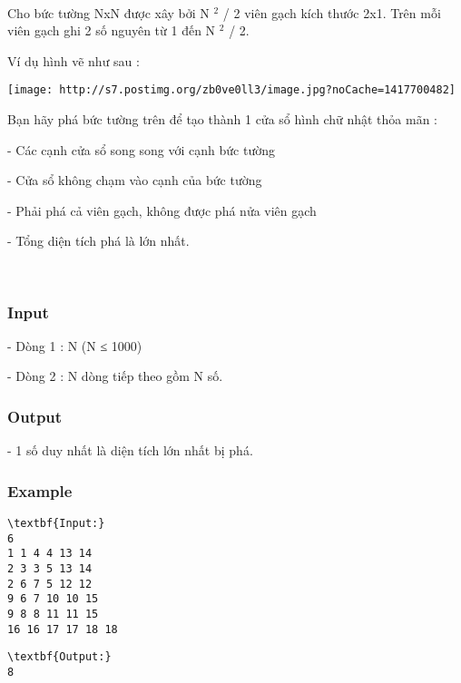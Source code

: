 

 

Cho bức tường NxN được xây bởi N $^ 2 $ / 2 viên gạch kích thước 2x1. Trên mỗi viên gạch ghi 2 số nguyên từ 1 đến N $^ 2 $ / 2.

Ví dụ hình vẽ như sau :


\texttt{[image: http://s7.postimg.org/zb0ve0ll3/image.jpg?noCache=1417700482]}

Bạn hãy phá bức tường trên để tạo thành 1 cửa sổ hình chữ nhật thỏa mãn :

- Các cạnh cửa sổ song song với cạnh bức tường

- Cửa sổ không chạm vào cạnh của bức tường

- Phải phá cả viên gạch, không được phá nửa viên gạch

- Tổng diện tích phá là lớn nhất.

 

\subsubsection{Input}

- Dòng 1 : N (N ≤ 1000)

- Dòng 2 : N dòng tiếp theo gồm N số.

\subsubsection{Output}

- 1 số duy nhất là diện tích lớn nhất bị phá.

\subsubsection{Example}
\begin{verbatim}
\textbf{Input:}
6
1 1 4 4 13 14
2 3 3 5 13 14
2 6 7 5 12 12
9 6 7 10 10 15
9 8 8 11 11 15
16 16 17 17 18 18 \end{verbatim}
\begin{verbatim}
\textbf{Output:}
8\end{verbatim}